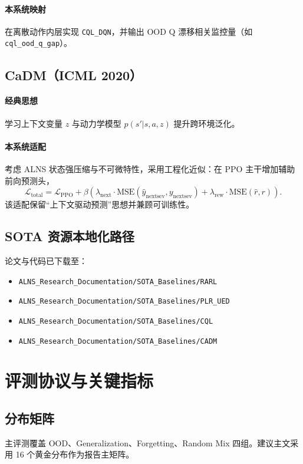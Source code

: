 \documentclass[UTF8,11pt,a4paper]{ctexart}
\begin{document}
\paragraph{本系统映射}
在离散动作内层实现 \texttt{CQL\_DQN}，并输出 OOD Q 漂移相关监控量（如 \texttt{cql\_ood\_q\_gap}）。

\subsection{CaDM（ICML 2020）}
\paragraph{经典思想}
学习上下文变量 \(z\) 与动力学模型 \(p(s'|s,a,z)\) 提升跨环境泛化。
\paragraph{本系统适配}
考虑 ALNS 状态强压缩与不可微特性，采用工程化近似：在 PPO 主干增加辅助前向预测头，
\begin{equation}
\mathcal{L}_{\text{total}}
=
\mathcal{L}_{\text{PPO}}
+\beta\left(
\lambda_{\text{next}}\cdot \mathrm{MSE}(\hat y_{\text{nextsev}},y_{\text{nextsev}})
+\lambda_{\text{rew}}\cdot \mathrm{MSE}(\hat r,r)
\right).
\end{equation}
该适配保留“上下文驱动预测”思想并兼顾可训练性。

\subsection{SOTA 资源本地化路径}
论文与代码已下载至：
\begin{itemize}
\item \texttt{ALNS\_Research\_Documentation/SOTA\_Baselines/RARL}
\item \texttt{ALNS\_Research\_Documentation/SOTA\_Baselines/PLR\_UED}
\item \texttt{ALNS\_Research\_Documentation/SOTA\_Baselines/CQL}
\item \texttt{ALNS\_Research\_Documentation/SOTA\_Baselines/CADM}
\end{itemize}

\section{评测协议与关键指标}
\subsection{分布矩阵}
主评测覆盖 OOD、Generalization、Forgetting、Random Mix 四组。建议主文采用 16 个黄金分布作为报告主矩阵。
\end{document}
